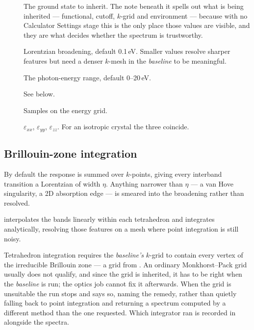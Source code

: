 \begin{description}
  \item[] The ground state to inherit. The note beneath
    it spells out what is being inherited --- functional, cutoff, $k$-grid and
    environment --- because with no Calculator Settings stage this is the only
    place those values are visible, and they are what decides whether the
    spectrum is trustworthy.
  \item[] Lorentzian broadening, default 0.1\,eV.
    Smaller values resolve sharper features but need a denser $k$-mesh in the
    \emph{baseline} to be meaningful.
  \item[] The photon-energy range, default
    0--20\,eV.
  \item[] See below.
  \item[] Samples on the energy grid.
  \item[] $\varepsilon_{xx}$, $\varepsilon_{yy}$,
    $\varepsilon_{zz}$. For an isotropic crystal the three coincide.
\end{description}

\subsection{Brillouin-zone integration}

By default the response is summed over $k$-points, giving every interband
transition a Lorentzian of width $\eta$. Anything narrower than $\eta$ --- a
van Hove singularity, a 2D absorption edge --- is smeared into the broadening
rather than resolved.

 interpolates the bands linearly within each
tetrahedron and integrates analytically, resolving those features on a mesh
where point integration is still noisy.

\begin{calwarn}
Tetrahedron integration requires the \emph{baseline's} $k$-grid to contain
every vertex of the irreducible Brillouin zone --- a grid from
. An ordinary
Monkhorst--Pack grid usually does not qualify, and since the grid is inherited,
it has to be right when the \emph{baseline} is run; the optics job cannot fix
it afterwards. When the grid is unsuitable the run stops and says so, naming
the remedy, rather than quietly falling back to point integration and returning
a spectrum computed by a different method than the one requested. Which
integrator ran is recorded in  alongside the spectra.
\end{calwarn}

